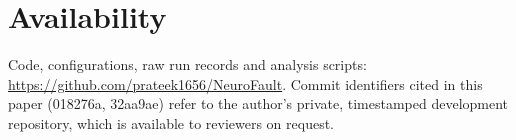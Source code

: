 \documentclass[journal]{IEEEtran}
\begin{document}
\section*{Availability}
Code, configurations, raw run records and analysis scripts: \url{https://github.com/prateek1656/NeuroFault}. Commit identifiers cited in this paper (018276a, 32aa9ae) refer to the author's private, timestamped development repository, which is available to reviewers on request.



\end{document}
